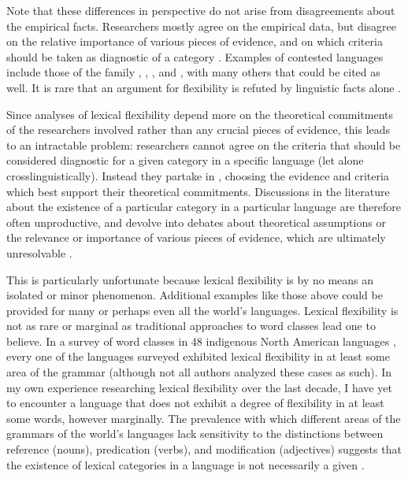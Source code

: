 Note that these differences in perspective do not arise from disagreements about the empirical facts. Researchers mostly agree on the empirical data, but disagree on the relative importance of various pieces of evidence, and on which criteria should be taken as diagnostic of a category \parencites[235]{Wetzer1992}[32]{Stassen1997}[58]{CroftLief2012}. Examples of contested languages include those of the  family \parencite{Chafe2012},  \parencites{EvansOsada2005}{HengeveldRijkhoff2005},  \parencites[17]{SchachterShopen2007}{Floyd2011}, and  \parencites[352]{Robins1968}[62--63]{Hardjadibrata1985}, with many others that could be cited as well. It is rare that an argument for flexibility is refuted by linguistic facts alone .

Since analyses of lexical flexibility depend more on the theoretical commitments of the researchers involved rather than any crucial pieces of evidence, this leads to an intractable problem: researchers cannot agree on the criteria that should be considered diagnostic for a given category in a specific language (let alone crosslinguistically). Instead they partake in  \parencite[30]{Croft2001b}, choosing the evidence and criteria which best support their theoretical commitments. Discussions in the literature about the existence of a particular category in a particular language are therefore often unproductive, and devolve into debates about theoretical assumptions or the relevance or importance of various pieces of evidence, which are ultimately unresolvable \parencite[435]{Croft2005}.

This is particularly unfortunate because lexical flexibility is by no means an isolated or minor phenomenon. Additional examples like those above could be provided for many or perhaps even all the world's languages. Lexical flexibility is not as rare or marginal as traditional approaches to word classes lead one to believe. In a survey of word classes in 48 indigenous North American languages \parencite{Hieberforthcoming}, every one of the languages surveyed exhibited lexical flexibility in at least some area of the grammar (although not all authors analyzed these cases as such). In my own experience researching lexical flexibility over the last decade, I have yet to encounter a language that does not exhibit a degree of flexibility in at least some words, however marginally. The prevalence with which different areas of the grammars of the world's languages lack sensitivity to the distinctions between reference (nouns), predication (verbs), and modification (adjectives) suggests that the existence of lexical categories in a language is not necessarily a given \parencite{Hieberforthcoming}.

